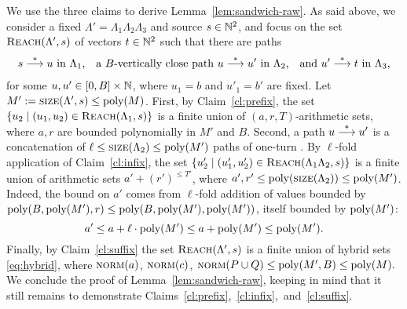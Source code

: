 \begin{appendixproof}
We use the three  claims to derive Lemma~\ref{lem:sandwich-raw}.
As said above,
we consider a fixed \slps $\Lambda' = \Lambda_1 \Lambda_2 \Lambda_3$ and source $s\in\mathbb{N}^2$,
and focus on the set $\textsc{Reach}(\Lambda', s)$ of vectors $t\in\mathbb{N}^2$ such that
there are paths 
%
\begin{align} \label{eq:paths}
\text{$s \tran u$ in $\Lambda_1$,  \ \  
a $B$-vertically close path $u \tran u'$ in $\Lambda_2$, \ \ 
and   $u'\tran t$ in $\Lambda_3$,}
\end{align}
%
for some $u,u'\in [0, B] \times \mathbb{N}$, where 
$u_1 = b$ and $u'_1 = b'$ are fixed.
Let $M':=\textsc{size}(\Lambda',s) \leq \textup{poly}(M)$.
%
%
First, by Claim~\ref{cl:prefix}, the set
$\{u_2 \mid (u_1, u_2) \in \textsc{Reach}(\Lambda_1,s)\}$ is a finite union of $(a, r, T)$-arithmetic sets,
where $a, r$ are bounded polynomially in $M'$ and $B$.
%
Second,
a path $u\stackrel{*}{\longrightarrow} u'$ is a concatenation of $\ell\leq \textsc{size}(\Lambda_2) \leq \textup{poly}(M')$
paths of one-turn \slps. 
By $\ell$-fold application of Claim~\ref{cl:infix}, the set
$\{u'_2 \mid (u'_1, u'_2) \in \textsc{Reach}(\Lambda_1 \Lambda_2,s)\}$
is a finite union of arithmetic sets
$a' + (r')^{\leq T'}$, where
$a', r' \leq \textup{poly}(\textsc{size}(\Lambda_2)) \leq \textup{poly}(M')$.
Indeed, the bound on $a'$ comes from $\ell$-fold addition of values bounded by 
$\textup{poly}(B, \textup{poly}(M'), r)\leq \textup{poly}(B, \textup{poly}(M'), \textup{poly}(M'))$,
itself bounded by $\textup{poly}(M')$:
%
\begin{equation}\label{eq:aprim}
a' \leq a + \ell \cdot \textup{poly}(M') \leq a + \textup{poly}(M') \leq \textup{poly}(M').
\end{equation}
%
Finally, by Claim~\ref{cl:suffix} the set $\textsc{Reach}(\Lambda',s)$ is a finite union of hybrid sets \eqref{eq:hybrid},
where
$
\textsc{norm}(a)$, $\textsc{norm}(c)$, $\textsc{norm}(P \cup Q) \leq \textup{poly}(M', B) \leq \textup{poly}(M).
$ 
We conclude the proof of Lemma~\ref{lem:sandwich-raw}, keeping in mind that
it still remains to demonstrate Claims~\ref{cl:prefix},~\ref{cl:infix},~and~\ref{cl:suffix}.


\end{appendixproof}
